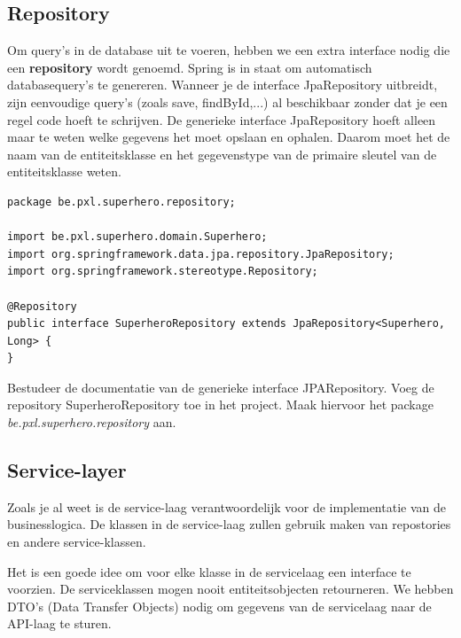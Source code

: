\subsection{Repository}

Om query's in de database uit te voeren, hebben we een extra interface nodig die een \textbf{repository} wordt genoemd. Spring is in staat om automatisch databasequery's te genereren. Wanneer je de interface JpaRepository uitbreidt, zijn eenvoudige query's (zoals save, findById,...) al beschikbaar zonder dat je een regel code hoeft te schrijven.
De generieke interface JpaRepository hoeft alleen maar te weten welke gegevens het moet opslaan en ophalen.
Daarom moet het de naam van de entiteitsklasse en het gegevenstype van de primaire sleutel van de entiteitsklasse weten.

\begin{lstlisting}[frame=single]
package be.pxl.superhero.repository;

import be.pxl.superhero.domain.Superhero;
import org.springframework.data.jpa.repository.JpaRepository;
import org.springframework.stereotype.Repository;

@Repository
public interface SuperheroRepository extends JpaRepository<Superhero, Long> {
}
\end{lstlisting}



\begin{oefening}
Bestudeer de documentatie van de generieke interface JPARepository.
Voeg de repository SuperheroRepository toe  in het project.  Maak hiervoor het package \textit{be.pxl.superhero.repository} aan.
\end{oefening}

\subsection{Service-layer}

Zoals je al weet is de service-laag verantwoordelijk voor de implementatie van de businesslogica. De klassen in de service-laag zullen gebruik maken van repostories en andere service-klassen.  

Het is een goede idee om voor elke klasse in de servicelaag een interface te voorzien.
De serviceklassen mogen nooit entiteitsobjecten retourneren. We hebben DTO's (Data Transfer Objects) nodig om gegevens van de servicelaag naar de API-laag te sturen.

